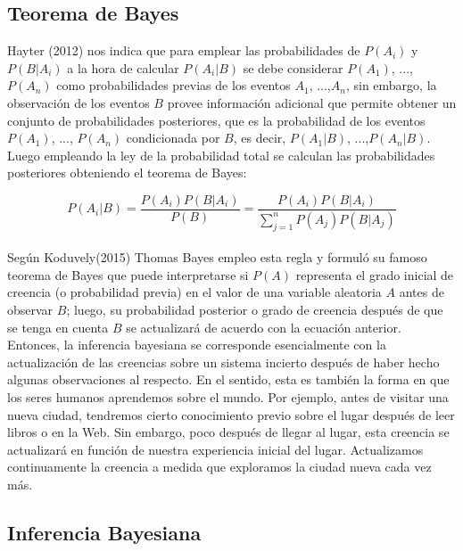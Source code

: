 \subsection{Teorema de Bayes}

Hayter (2012) nos indica que para emplear las probabilidades de $P\left(A_{i}\right)$ y $P\left(B|A_{i}\right)$ a la hora de calcular $P\left(A_{i}|B\right)$ se debe considerar  $P\left(A_{1}\right)$, ..., $P\left(A_{n}\right)$ como probabilidades previas de los eventos $A_{1}$, ...,$A_{n}$, sin embargo, la observación de los eventos $B$ provee información adicional que permite obtener un conjunto de probabilidades posteriores, que es la probabilidad de los eventos $P\left(A_{1}\right)$, ..., $P\left(A_{n}\right)$ condicionada por $B$, es decir, $P\left(A_{1}|B\right)$, ...,$P\left(A_{n}|B\right)$.\\

Luego empleando la ley de la probabilidad total se calculan las probabilidades posteriores obteniendo el teorema de Bayes:

\[P\left(A_{i}|B\right)=
\frac{P\left(A_{i}\right)P\left(B|A_{i}\right)}{P\left(B\right)}=
\frac{P\left(A_{i}\right)P\left(B|A_{i}\right)}{\sum_{j=1}^{n}P\left(A_{j}\right)P\left(B|A_{j}\right)}
\]\\

Según Koduvely(2015) Thomas Bayes empleo esta regla y formuló su famoso teorema de Bayes que puede interpretarse si $P\left(A\right)$ representa el grado inicial de creencia (o probabilidad previa) en el valor de una variable aleatoria $A$ antes de observar $B$; luego, su probabilidad posterior o grado de creencia después de que se tenga en cuenta $B$ se actualizará de acuerdo con la ecuación anterior. Entonces, la inferencia bayesiana se corresponde esencialmente con la actualización de las creencias sobre un sistema incierto después de haber hecho algunas observaciones al respecto. En el sentido, esta es también la forma en que los seres humanos aprendemos sobre el mundo. Por ejemplo, antes de visitar una nueva ciudad, tendremos cierto conocimiento previo sobre el lugar después de leer libros o en la Web. Sin embargo, poco después de llegar al lugar, esta creencia se actualizará en función de nuestra experiencia inicial del lugar. Actualizamos continuamente la creencia a medida que exploramos la ciudad nueva cada vez más.\\

\subsection{Inferencia Bayesiana}

